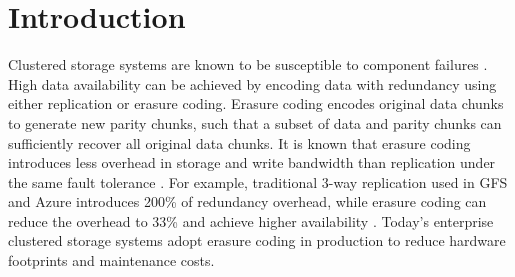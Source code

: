\chapter{Introduction}
\label{sec:introduction}

Clustered storage systems are known to be susceptible to component failures
\cite{ghemawat03}.  High data availability can be achieved by encoding data
with redundancy using either replication or erasure coding.  Erasure coding
encodes original data chunks to generate new parity chunks, such that a subset
of data and parity chunks can sufficiently recover all original data chunks.
It is known that erasure coding introduces less overhead in storage and write
bandwidth than replication under the same fault tolerance
\cite{weatherspoon02,rodrigues05}.  For example, traditional 3-way replication
used in GFS \cite{ghemawat03} and Azure \cite{calder11} introduces 200\% of
redundancy overhead, while erasure coding can reduce the overhead to 33\%
and achieve higher availability \cite{huang12}.  Today's enterprise
clustered storage systems
\cite{welch08,ford10,huang12,sathiamoorthy13,resch11} adopt erasure coding in
production to reduce hardware footprints and maintenance costs.

